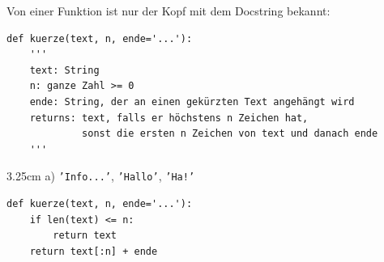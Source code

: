 \question[5]
Von einer Funktion ist nur der Kopf mit dem Docstring bekannt:
\begin{lstlisting}
def kuerze(text, n, ende='...'):
    '''
    text: String
    n: ganze Zahl >= 0
    ende: String, der an einen gekürzten Text angehängt wird
    returns: text, falls er höchstens n Zeichen hat,
             sonst die ersten n Zeichen von text und danach ende
    '''
\end{lstlisting}
\begin{solutionbox}{3.25cm}
a) \texttt{'Info...'}, \texttt{'Hallo'}, \texttt{'Ha!'}
\begin{lstlisting}
def kuerze(text, n, ende='...'):
    if len(text) <= n:
        return text
    return text[:n] + ende
\end{lstlisting}
\end{solutionbox}
